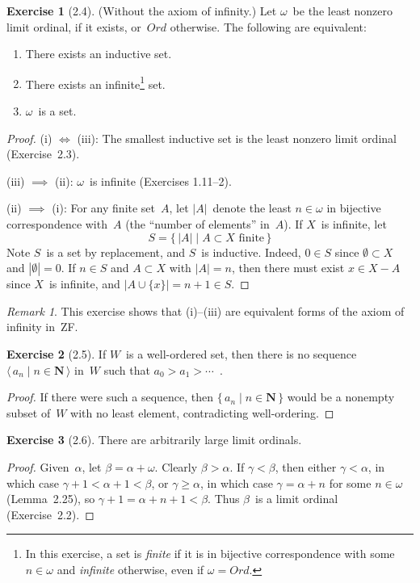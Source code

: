 \documentclass[letterpaper,12pt]{article}
\newcommand{\N}{\boldsymbol{N}}
\newcommand{\Ord}{\mathit{Ord}}
\newcommand{\union}{\cup}
\newcommand{\card}[1]{|#1|}
\newcommand{\seq}[1]{\langle#1\rangle}
\theoremstyle{definition}
\newtheorem*{exer}{Exercise}
\theoremstyle{remark}
\newtheorem*{rmk}{Remark}
\begin{document}
\begin{exer}[2.4]
(Without the axiom of infinity.) Let \(\omega\)~be the least nonzero limit ordinal, if it exists, or~\(\Ord\) otherwise. The following are equivalent:
\begin{enumerate}[itemsep=0pt]
\item[(i)] There exists an inductive set.
\item[(ii)] There exists an infinite\footnote{In this exercise, a set is \emph{finite} if it is in bijective correspondence with some \(n\in\omega\) and \emph{infinite} otherwise, even if \(\omega=\Ord\).} set.
\item[(iii)] \(\omega\)~is a set.
\end{enumerate}
\end{exer}
\begin{proof}
(i) \(\iff\) (iii): The smallest inductive set is the least nonzero limit ordinal (Exercise~2.3).

(iii) \(\implies\) (ii): \(\omega\)~is infinite (Exercises 1.11--2).

(ii) \(\implies\) (i): For any finite set~\(A\), let \(\card{A}\)~denote the least \(n\in\omega\) in bijective correspondence with~\(A\) (the ``number of elements'' in~\(A\)). If \(X\)~is infinite, let
\[S=\{\,\card{A}\mid A\subset X\text{ finite}\,\}\]
Note \(S\)~is a set by replacement, and \(S\)~is inductive. Indeed, \(0\in S\) since \(\emptyset\subset X\) and \(\card{\emptyset}=0\). If \(n\in S\) and \(A\subset X\) with \(\card{A}=n\), then there must exist \(x\in X-A\) since \(X\)~is infinite, and \(\card{A\union\{x\}}=n+1\in S\).
\end{proof}
\begin{rmk}
This exercise shows that (i)--(iii) are equivalent forms of the axiom of infinity in~ZF.
\end{rmk}

\begin{exer}[2.5]
If \(W\)~is a well-ordered set, then there is no sequence \(\seq{\,a_n\mid n\in\N\,}\) in~\(W\) such that \(a_0>a_1>\cdots\)\ .
\end{exer}
\begin{proof}
If there were such a sequence, then \(\{\,a_n\mid n\in\N\,\}\) would be a nonempty subset of~\(W\) with no least element, contradicting well-ordering.
\end{proof}

\begin{exer}[2.6]
There are arbitrarily large limit ordinals.
\end{exer}
\begin{proof}
Given~\(\alpha\), let \(\beta=\alpha+\omega\). Clearly \(\beta>\alpha\). If \(\gamma<\beta\), then either \(\gamma<\alpha\), in which case \(\gamma+1<\alpha+1<\beta\), or \(\gamma\ge\alpha\), in which case \(\gamma=\alpha+n\) for some \(n\in\omega\) (Lemma~2.25), so \(\gamma+1=\alpha+n+1<\beta\). Thus \(\beta\)~is a limit ordinal (Exercise~2.2).
\end{proof}
\end{document}
